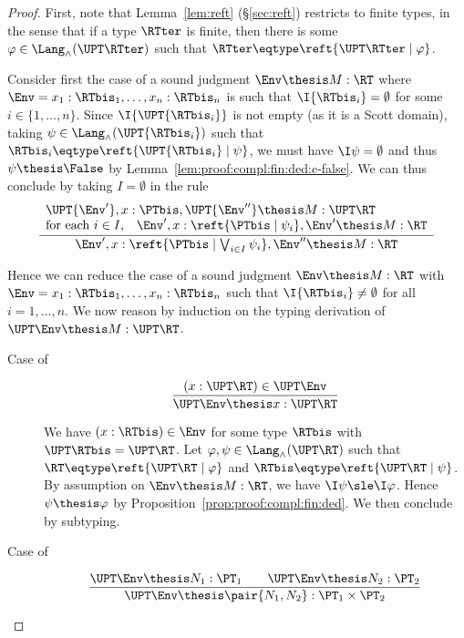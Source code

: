 \begin{proof}
First, note that Lemma~\ref{lem:reft} (\S\ref{sec:reft})
restricts to finite types, in the sense that if a type
$\RTter$ is finite, then there is some $\varphi \in \Lang_\land(\UPT\RTter)$
such that $\RTter \eqtype \reft{\UPT\RTter \mid \varphi}$.

Consider first the case of a sound judgment
$\Env \thesis M : \RT$
where 
$\Env = x_1:\RTbis_1,\dots,x_n:\RTbis_n$
is such that $\I{\RTbis_i} = \emptyset$ for some $i \in \{1,\dots,n\}$.
Since $\I{\UPT{\RTbis_i}}$ is not empty (as it is a Scott domain),
taking $\psi \in \Lang_\land(\UPT{\RTbis_i})$
such that $\RTbis_i \eqtype \reft{\UPT{\RTbis_i} \mid \psi}$,
we must have $\I\psi = \emptyset$
and thus $\psi \thesis \False$ by Lemma~\ref{lem:proof:compl:fin:ded:c-false}.
We can thus conclude by taking $I = \emptyset$ in the rule
\[
\dfrac{
  \begin{array}{l}
  \UPT{\Env'}, x:\PTbis, \UPT{\Env''} \thesis M : \UPT\RT
  \\
  \text{for each $i \in I$,}\quad
  \Env', x:\reft{\PTbis \mid \psi_i},\Env' \thesis M : \RT
  \end{array}}
  {\Env', x : \reft{\PTbis \mid \bigvee_{i \in I} \psi_i} , \Env'' \thesis M : \RT}
\]




Hence we can reduce the case of a sound judgment
$\Env \thesis M : \RT$ with
$\Env = x_1:\RTbis_1,\dots,x_n:\RTbis_n$
such that $\I{\RTbis_i} \neq \emptyset$ for all $i = 1,\dots,n$.
We now reason by induction on the typing derivation of $\UPT\Env \thesis M : \UPT\RT$.
\begin{description}
\item[Case of]
\[
\dfrac{(x:\UPT\RT) \in \UPT\Env}
  {\UPT\Env \thesis x:\UPT\RT}
\]

We have $(x : \RTbis) \in \Env$ for some type $\RTbis$ with $\UPT\RTbis = \UPT\RT$.
Let $\varphi,\psi \in \Lang_\land(\UPT\RT)$
such that $\RT \eqtype \reft{\UPT\RT \mid \varphi}$
and $\RTbis \eqtype \reft{\UPT\RT \mid \psi}$.
By assumption on $\Env \thesis M :\RT$,
we have $\I\psi \sle \I\varphi$.
Hence $\psi \thesis \varphi$
by Proposition~\ref{prop:proof:compl:fin:ded}.
We then conclude by subtyping.

\item[Case of]
\[
\dfrac{\UPT\Env \thesis N_1 : \PT_1
  \qquad
  \UPT\Env \thesis N_2 : \PT_2}
  {\UPT\Env \thesis \pair{N_1,N_2} : \PT_1 \times \PT_2}
\]


\end{description}
\end{proof}
